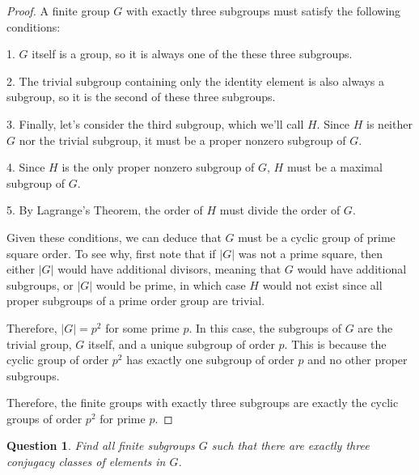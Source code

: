 \documentclass{amsart}
\theoremstyle{plain}
\newtheorem{question}{Question}
\begin{document}
\begin{proof}A finite group $G$ with exactly three subgroups must satisfy the following conditions:

1. $G$ itself is a group, so it is always one of the these three subgroups.

2. The trivial subgroup containing only the identity element is also always a subgroup, so it is the second of these three subgroups.

3. Finally, let's consider the third subgroup, which we'll call $H$. Since $H$ is neither $G$ nor the trivial subgroup, it must be a proper nonzero subgroup of $G$.

4. Since $H$ is the only proper nonzero subgroup of $G$, $H$ must be a maximal subgroup of $G$.

5. By Lagrange's Theorem, the order of $H$ must divide the order of $G$. 

Given these conditions, we can deduce that $G$ must be a cyclic group of prime square order. To see why, first note that if $|G|$ was not a prime square, then either $|G|$ would have additional divisors, meaning that $G$ would have additional subgroups, or $|G|$ would be prime, in which case $H$ would not exist since all proper subgroups of a prime order group are trivial.

Therefore, $|G|=p^2$ for some prime $p$. In this case, the subgroups of $G$ are the trivial group, $G$ itself, and a unique subgroup of order $p$. This is because the cyclic group of order $p^2$ has exactly one subgroup of order $p$ and no other proper subgroups.

Therefore, the finite groups with exactly three subgroups are exactly the cyclic groups of order $p^2$ for prime $p$.
\end{proof}
\begin{question}
    Find all finite subgroups $G$ such that there are exactly three conjugacy classes of elements in $G$.
\end{question}
\end{document}
